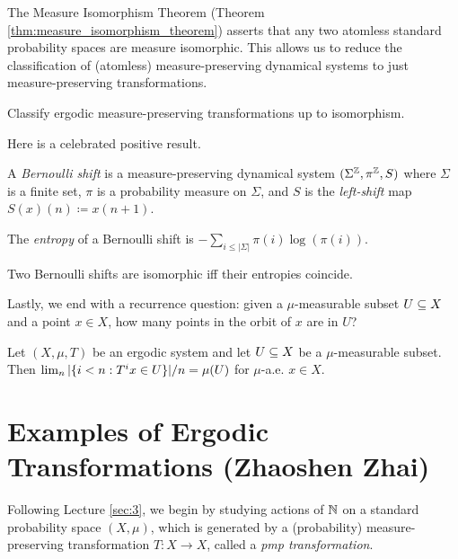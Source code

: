 \documentclass[reqno, twoside]{article}
\begin{document}
    The Measure Isomorphism Theorem (Theorem \ref{thm:measure_isomorphism_theorem}) asserts that any two atomless standard probability spaces are measure isomorphic. This allows us to reduce the classification of (atomless) measure-preserving dynamical systems to just measure-preserving transformations.

    \begin{open}
        Classify ergodic measure-preserving transformations up to isomorphism.
    \end{open}

    Here is a celebrated positive result.

    \begin{definition}
        A \textit{Bernoulli shift} is a measure-preserving dynamical system $(\Sigma^{\mathbb{Z}},\pi^{\mathbb{Z}},S)$ where $\Sigma$ is a finite set, $\pi$ is a probability measure on $\Sigma$, and $S$ is the \textit{left-shift} map $S(x)(n)\coloneqq x(n+1)$.

        The \textit{entropy} of a Bernoulli shift is $-\sum_{i\leq|\Sigma|}\pi(i)\log(\pi(i))$.
    \end{definition}

    \begin{theorem}[Ornstein]
        Two Bernoulli shifts are isomorphic iff their entropies coincide.
    \end{theorem}

    Lastly, we end with a recurrence question: given a $\mu$-measurable subset $U\subseteq X$ and a point $x\in X$, how many points in the orbit of $x$ are in $U$?

    \begin{theorem}
        Let $(X,\mu,T)$ be an ergodic system and let $U\subseteq X$ be a $\mu$-measurable subset. Then $\lim_n|\{i<n: T^ix\in U\}|/n=\mu(U)$ for $\mu$-a.e. $x\in X$.
    \end{theorem}

    \section{Examples of Ergodic Transformations (Zhaoshen Zhai)}\label{sec:4}

    Following Lecture \ref{sec:3}, we begin by studying actions of $\mathbb{N}$ on a standard probability space $(X,\mu)$, which is generated by a (probability) measure-preserving transformation $T:X\to X$, called a \textit{pmp transformation}.
\end{document}
